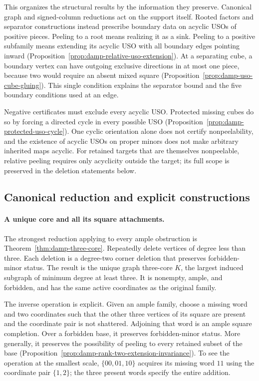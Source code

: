 \documentclass[11pt]{article}
\numberwithin{equation}{section}
\theoremstyle{definition}
\theoremstyle{remark}
\begin{document}
This organizes the structural results by the information they preserve.
Canonical graph and signed-column reductions act on the support itself.
Rooted factors and separator constructions instead prescribe boundary data
on acyclic USOs of positive pieces. Peeling to a root means realizing it
as a sink. Peeling to a positive subfamily means extending its acyclic USO
with all boundary edges pointing inward
(Proposition~\ref{prop:damp-relative-uso-extension}). At a separating cube,
a boundary vertex can have outgoing exclusive directions in at most one
piece, because two would require an absent mixed square
(Proposition~\ref{prop:damp-uso-cube-gluing}). This single condition explains
the separator bound and the five boundary conditions used at an edge.

Negative certificates must exclude every acyclic USO. Protected missing
cubes do so by forcing a directed cycle in every possible USO
(Proposition~\ref{prop:damp-protected-uso-cycle}). One cyclic orientation
alone does not certify nonpeelability, and the existence of acyclic USOs
on proper minors does not make arbitrary inherited maps acyclic.
For retained targets that are themselves nonpeelable, relative peeling
requires only acyclicity outside the target; its full scope is preserved
in the deletion statements below.

\subsection{Canonical reduction and explicit constructions}

\paragraph{A unique core and all its square attachments.}
The strongest reduction applying to every ample obstruction is
Theorem~\ref{thm:damp-three-core}.  Repeatedly delete vertices of
degree less than three.  Each deletion is a degree-two corner deletion
that preserves forbidden-minor status.  The result is the unique graph
three-core \(K\), the largest induced subgraph of minimum degree at
least three.  It is nonempty, ample, and forbidden, and has the same
active coordinates as the original family.

The inverse operation is explicit.  Given an ample family, choose a
missing word and two coordinates such that the other three vertices
of its square are present and the coordinate pair is not shattered.
Adjoining that word is an ample square completion.  Over a forbidden
base, it preserves forbidden-minor status.  More generally, it preserves
the possibility of peeling to every retained subset of the base
(Proposition~\ref{prop:damp-rank-two-extension-invariance}).
To see the operation at
the smallest scale, \(\{00,01,10\}\) acquires its missing word
\(11\) using the coordinate pair \(\{1,2\}\); the three present
words specify the entire addition.
\end{document}
